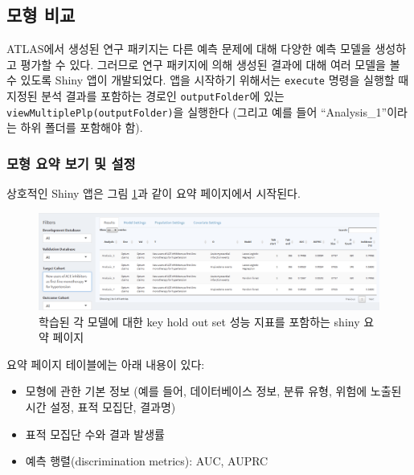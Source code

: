 \documentclass[11pt]{book}
\providecommand{\tightlist}{%
  \setlength{\itemsep}{0pt}\setlength{\parskip}{0pt}}
\theoremstyle{definition}
\theoremstyle{definition}
\theoremstyle{definition}
\theoremstyle{remark}
\begin{document}
\subsection{모형 비교}\label{-}

ATLAS에서 생성된 연구 패키지는 다른 예측 문제에 대해 다양한 예측 모델을
생성하고 평가할 수 있다. 그러므로 연구 패키지에 의해 생성된 결과에 대해
여러 모델을 볼 수 있도록 Shiny 앱이 개발되었다. 앱을 시작하기 위해서는
\texttt{execute} 명령을 실행할 때 지정된 분석 결과를 포함하는 경로인
\texttt{outputFolder}에 있는 \texttt{viewMultiplePlp(outputFolder)}을
실행한다 (그리고 예를 들어 ``Analysis\_1''이라는 하위 폴더를 포함해야
함).

\subsubsection*{모형 요약 보기 및 설정}\label{----}

상호적인 Shiny 앱은 그림 \ref{fig:multiShinySummary}과 같이 요약
페이지에서 시작된다.

\begin{figure}

{\centering \includegraphics[width=1\linewidth]{images/PatientLevelPrediction/shiny/shinyFilter} 

}

\caption{학습된 각 모델에 대한 key hold out set 성능 지표를 포함하는 shiny 요약 페이지}\label{fig:multiShinySummary}
\end{figure}

요약 페이지 테이블에는 아래 내용이 있다:

\begin{itemize}
\tightlist
\item
  모형에 관한 기본 정보 (예를 들어, 데이터베이스 정보, 분류 유형, 위험에
  노출된 시간 설정, 표적 모집단, 결과명)
\item
  표적 모집단 수와 결과 발생률
\item
  예측 행렬(discrimination metrics): AUC, AUPRC
\end{itemize}
\end{document}
